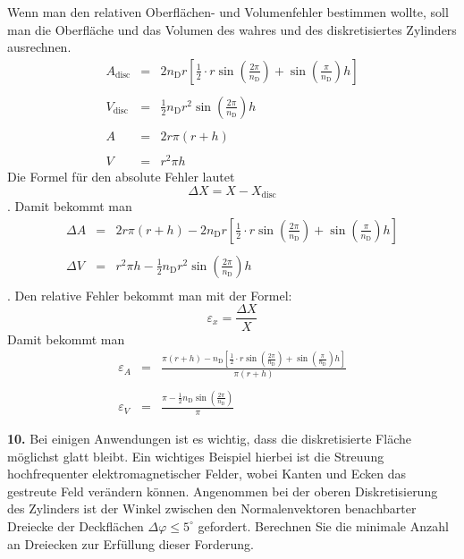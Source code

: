\documentclass[Protokollheft.tex]{subfiles}
\begin{document}
  Wenn man den relativen Oberflächen- und Volumenfehler bestimmen wollte, soll man die Oberfläche und das Volumen des wahres und des diskretisiertes Zylinders ausrechnen.
  \begin{eqnarray*}
  	A_\text{disc}&=&2n_\text{D}r\left[ \frac12 \cdot r \sin\left(\frac{2 \pi}{n_\text{D}}\right)+ \sin\left(\frac{\pi}{n_\text{D}}\right)h  \right]\\
  	\\
  	V_\text{disc}&=&\frac12 n_\text{D} r^2 \sin\left(\frac{ 2\pi}{n_\text{D}}\right)h\\
  	\\
  	A&=&2 r \pi (r+h)\\
  	\\
  	V&=&r^2\pi h
  \end{eqnarray*}
  Die Formel für den absolute Fehler lautet\\
  $$\Delta X = X- X_\text{disc}$$.
  Damit bekommt man
  \begin{eqnarray*}
  	\Delta A&=&2 r \pi (r+h) -2n_\text{D}r\left[ \frac12 \cdot r \sin\left(\frac{2 \pi}{n_\text{D}}\right)+ \sin\left(\frac{\pi}{n_\text{D}}\right)h  \right]\\
  	\\
  	\Delta V&=&r^2\pi h -\frac12 n_\text{D} r^2 \sin\left(\frac{ 2\pi}{n_\text{D}}\right)h\\
  \end{eqnarray*}.
	Den relative Fehler bekommt man mit der Formel:
  	$$\varepsilon_{x}=\frac{\Delta X}{X}$$
  	Damit bekommt man
  	\begin{eqnarray*}
  	\varepsilon_{A}&=&\frac{ \pi (r+h) -n_\text{D}\left[ \frac12 \cdot r \sin\left(\frac{2 \pi}{n_\text{D}}\right)+ \sin\left(\frac{\pi}{n_\text{D}}\right)h  \right]}{\pi (r+h)}\\
  	\\
  	\varepsilon_{V}&=&\frac{\pi  -\frac12 n_\text{D}  \sin\left(\frac{ 2\pi}{n_\text{D}}\right)}{\pi}
  \end{eqnarray*}
    \begin{framed}
	\noindent \textbf{10.} Bei einigen Anwendungen ist es wichtig, dass die diskretisierte Fläche möglichst glatt bleibt. Ein
          wichtiges Beispiel hierbei ist die Streuung hochfrequenter elektromagnetischer Felder, wobei
          Kanten und Ecken das gestreute Feld verändern können. Angenommen bei der oberen
          Diskretisierung des Zylinders ist der Winkel zwischen den Normalenvektoren benachbarter Dreiecke der Deckflächen $\Delta \varphi \leq 5^{\circ}$ gefordert.
          Berechnen Sie die minimale Anzahl an Dreiecken zur Erfüllung dieser Forderung.\label{exer:smoothArea}
\end{framed}
\end{document}
